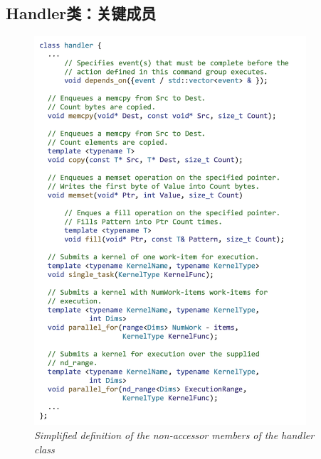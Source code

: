 \subsection{Handler类：关键成员}
\begin{figure}[H]
	\centering
	\includegraphics[width=0.9\textwidth]{figs/F3.17.png}
	\caption{\textit{Simplified definition of the non-accessor members of the handler class}}
\end{figure}

